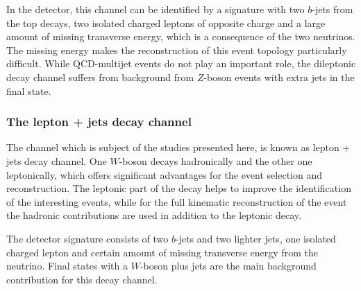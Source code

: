  In the detector, this channel can be identified by a  signature with two $b$-jets from the top decays, two isolated charged leptons of opposite charge and a large amount of missing transverse energy, which is  a consequence of the two neutrinos.
The missing energy makes the reconstruction of this event topology particularly difficult. While QCD-multijet events do not play an important role, the dileptonic decay channel suffers from background from $Z$-boson events with extra jets in the final state.   

\subsubsection{The lepton + jets  decay channel}
The channel which is subject of the studies presented here, is  known as lepton + jets decay channel. One $W$-boson decays hadronically and  the other one leptonically, which offers significant advantages for the event selection and reconstruction. The leptonic  part of the decay helps to improve the identification of the interesting   events, while for the full kinematic reconstruction of the event the hadronic contributions are used in addition to the leptonic decay. 

 The detector signature consists of two $b$-jets and two lighter jets, one isolated charged lepton and certain amount of missing transverse energy from the neutrino. Final states with a $W$-boson plus jets are the main background contribution for this decay channel.   
  

 
 \vspace{0.5cm} 
  
  
  
  
  
  
  
  
  
